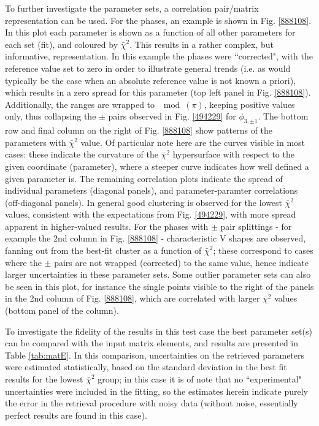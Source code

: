 \documentclass[10pt]{article}
\begin{document}

To further investigate the parameter sets, a correlation pair/matrix representation can be used. For the phases, an example is shown in Fig. \ref{888108}. In this plot each parameter is shown as a function of all other parameters for each set (fit), and coloured by $\bar{\chi}^2$. This results in a rather complex, but informative, representation. In this example the phases were ``corrected", with the reference value set to zero in order to illustrate general trends (i.e. as would typically be the case when an absolute reference value is not known a priori), which results in a zero spread for this parameter (top left panel in Fig. \ref{888108}). Additionally, the ranges are wrapped to $\mod(\pi)$, keeping positive values only, thus collapsing the $\pm$ pairs observed in Fig. \ref{494229} for $\phi_{3,\pm1}$. The bottom row and final column on the right of Fig. \ref{888108} show patterns of the parameters with $\bar{\chi}^2$ value. Of particular note here are the curves visible in most cases: these indicate the curvature of the $\bar{\chi}^2$ hypersurface with respect to the given coordinate (parameter), where a steeper curve indicates how well defined a given parameter is. The remaining correlation plots indicate the spread of individual parameters (diagonal panels), and parameter-paramter correlations (off-diagonal panels). In general good clustering is observed for the lowest $\bar{\chi}^2$ values, %
consistent with the expectations from Fig. \ref{494229}, with more spread apparent in higher-valued results. For the phases with $\pm$ pair splittings - for example the 2nd column in Fig. \ref{888108} - characteristic V shapes are observed, fanning out from the best-fit cluster as a function of $\bar{\chi}^2$; these correspond to cases where the $\pm$ pairs are not wrapped (corrected) to the same value, hence indicate larger uncertainties in these parameter sets. Some outlier parameter sets can also be seen in this plot, for instance the single points visible to the right of the panels in the 2nd column of Fig. \ref{888108}, which are correlated with larger $\bar{\chi}^2$ values (bottom panel of the column).

To investigate the fidelity of the results in this test case the best parameter set(s) can be compared with the input matrix elements, and results are presented in Table \ref{tab:matE}. In this comparison, uncertainties on the retrieved parameters were estimated statistically, based on the standard deviation in the best fit results for the lowest $\bar{\chi}^2$ group; in this case it is of note that no ``experimental" uncertainties were included in the fitting, so the estimates herein indicate purely the error in the retrieval procedure with noisy data (without noise, essentially perfect results are found in this case). 
\end{document}
